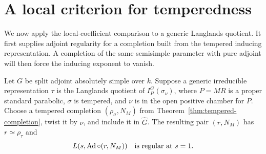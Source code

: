 \section{A local criterion for temperedness}\label{sec:local-criterion}

We now apply the local-coefficient comparison to a generic Langlands
quotient. It first supplies adjoint regularity for a completion built
from the tempered inducing representation. A completion of the same
semisimple parameter with pure adjoint will then force the inducing
exponent to vanish.

\begin{proposition}\label{prop:generic-regularity}
Let $G$ be split adjoint absolutely simple over $k$. Suppose a generic
irreducible representation $\tau$ is the Langlands quotient of
$I_P^G(\sigma_\nu)$, where $P=MR$ is a proper standard parabolic,
$\sigma$ is tempered, and $\nu$ is in the open positive chamber for $P$.
Choose a tempered completion $(\rho_\sigma,N_M)$ from
Theorem~\ref{thm:tempered-completion}, twist it by $\nu$, and include
it in $\widehat G$. The resulting pair $(r,N_M)$ has
$r\simeq\rho_\tau$ and
\[
 L(s,\operatorname{Ad}\circ(r,N_M))\quad\text{is regular at }s=1.
\]
\end{proposition}

